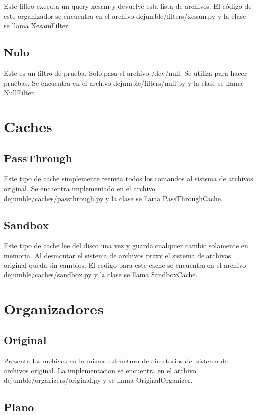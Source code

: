 Este filtro executa un query xesam y devuelve esta lista de archivos. El código de este organizador se encuentra en el archivo dejumble/filters/xesam.py y la clase se llama XesamFilter.

\subsection{Nulo}

Este es un filtro de prueba. Solo pasa el archivo /dev/null. Se utiliza para hacer pruebas. Se encuentra en el archivo dejumble/filters/null.py y la clase se llama NullFilter.


\section{Caches}

\subsection{PassThrough}

Este tipo de cache simplemente reenvia todos los comandos al sistema de archivos original. Se encuentra implementado en el archivo dejumble/caches/passthrough.py y la clase se llama PassThroughCache.

\subsection{Sandbox}

Este tipo de cache lee del disco una vez y guarda cualquier cambio solamente en memoria. Al desmontar el sistema de archivos proxy el sistema de archivos original queda sin cambios. El codigo para este cache se encuentra en el archivo dejumble/caches/sandbox.py y la clase se llama SandboxCache.


\section{Organizadores}

\subsection{Original}

Presenta los archivos en la misma estructura de directorios del sistema de archivos original. La implementacion se encuentra en el archivo dejumble/organizers/original.py y se llama OriginalOrganizer.

\subsection{Plano}

